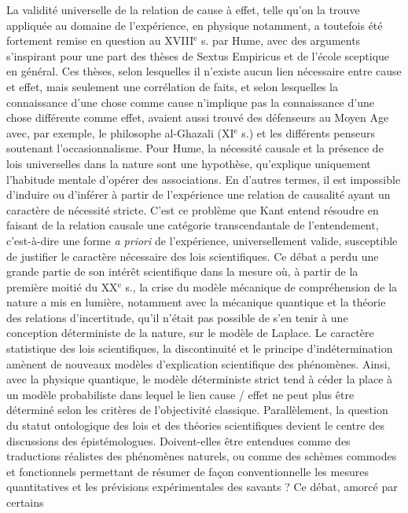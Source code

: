 La validité universelle de la relation de
cause à effet, telle qu’on la trouve appliquée au domaine de l'expérience, en
physique notamment, a toutefois été fortement remise en question au {\footnotesize XVIII}$^\text{e}$ s. par
Hume, avec des arguments s’inspirant
pour une part des thèses de Sextus Empiricus et de l’école sceptique en général.
Ces thèses, selon lesquelles il n’existe
aucun lien nécessaire entre cause et effet,
mais seulement une corrélation de faits,
et selon lesquelles la connaissance d’une
chose comme cause n’implique pas la
connaissance d’une chose différente
comme effet, avaient aussi trouvé des
défenseurs au Moyen Age avec, par
exemple, le philosophe al-Ghazali ({\footnotesize XI}$^\text{e}$ s.)
et les différents penseurs soutenant l’occasionnalisme. Pour Hume, la nécessité
causale et la présence de lois universelles
dans la nature sont une hypothèse, qu’explique uniquement l'habitude mentale
d'opérer des associations. En d’autres
termes, il est impossible d’induire ou d’inférer à partir de l’expérience une relation
de causalité ayant un caractère de nécessité stricte. C’est ce problème que Kant
entend résoudre en faisant de la relation
causale une catégorie transcendantale de
l'entendement, c’est-à-dire une forme {\it a
priori} de l'expérience, universellement
valide, susceptible de justifier le caractère
nécessaire des lois scientifiques. Ce débat
a perdu une grande partie de son intérêt
scientifique dans la mesure où, à partir de
la première moitié du {\footnotesize XX}$^\text{e}$ s., la crise du
modèle mécanique de compréhension de
la nature a mis en lumière, notamment
avec la mécanique quantique et la théorie
des relations d’incertitude, qu’il n’était
pas possible de s’en tenir à une conception déterministe de la nature, sur le
modèle de Laplace. Le caractère statistique des lois scientifiques, la discontinuité et le principe d’indétermination
amènent de nouveaux modèles d’explication scientifique des phénomènes. Ainsi,
avec la physique quantique, le modèle
déterministe strict tend à céder la place à
un modèle probabiliste dans lequel le lien
cause / effet ne peut plus être déterminé
selon les critères de l’objectivité classique.
Parallèlement, la question du statut ontologique des lois et des théories scientifiques devient le centre des discussions
des épistémologues. Doivent-elles être
entendues comme des traductions réalistes des phénomènes naturels, ou
comme des schèmes commodes et fonctionnels permettant de résumer de façon
conventionnelle les mesures quantitatives
et les prévisions expérimentales des
savants ? Ce débat, amorcé par certains
